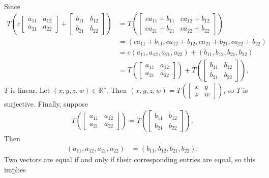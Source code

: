 \documentclass[12pt,letterpaper,reqno]{article}
\numberwithin{equation}{section}
\newcommand{\R}{\ensuremath{\mathbb R}}
\begin{document}
{\color{red}
\begin{solution}
Since
\begin{align*}
	T\left(c\begin{bmatrix}
		a_{11} & a_{12} \\
		a_{21} & a_{22}
	\end{bmatrix}+\begin{bmatrix}
		b_{11} & b_{12} \\
		b_{21} & b_{22}
	\end{bmatrix}\right)&=T\left(\begin{bmatrix}
		ca_{11}+b_{11} & ca_{12}+b_{12} \\
		ca_{21}+b_{21} & ca_{22}+b_{22}\end{bmatrix}\right)\\
		&=(ca_{11}+b_{11}, ca_{12}+b_{12}, ca_{21}+b_{21}, ca_{22}+b_{22}) \\
		&=c(a_{11}, a_{12}, a_{21}, a_{22})+(b_{11}, b_{12}, b_{21}, b_{22}) \\
		&=T\left(\begin{bmatrix}
		a_{11} & a_{12} \\
		a_{21} & a_{22}
	\end{bmatrix}\right)+T\left(\begin{bmatrix}
		b_{11} & b_{12} \\
		b_{21} & b_{22}
	\end{bmatrix}\right),
\end{align*}	
$T$ is linear. Let $(x,y,z,w) \in \R^4$. Then $(x,y,z,w)=T\left(\begin{bmatrix}
	x & y \\
	z & w
\end{bmatrix}\right)$, so $T$ is surjective. Finally, suppose
\begin{align*}
	T\left(\begin{bmatrix}
	a_{11} & a_{12} \\
	a_{21} & a_{22}
\end{bmatrix}\right)=T\left(\begin{bmatrix}
	b_{11} & b_{12} \\
	b_{21} & b_{22}
\end{bmatrix}\right).
\end{align*}
Then
\begin{align*}
	(a_{11}, a_{12}, a_{21}, a_{22})&=(b_{11}, b_{12}, b_{21}, b_{22}).
\end{align*}
Two vectors are equal if and only if their corresponding entries are equal, so this implies
\begin{align*}

\end{align*}
\end{solution}}
\end{document}
